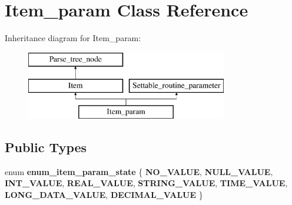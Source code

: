 \hypertarget{classItem__param}{}\section{Item\+\_\+param Class Reference}
\label{classItem__param}
Inheritance diagram for Item\+\_\+param\+:\begin{figure}[H]
\begin{center}
\leavevmode
\includegraphics[height=3.000000cm]{classItem__param}
\end{center}
\end{figure}
\subsection*{Public Types}
\begin{DoxyCompactItemize}
\item 
\mbox{\label{classItem__param_a8b808a2cd552ba160b33df4760a58143}} 
enum {\bfseries enum\+\_\+item\+\_\+param\+\_\+state} \{ \newline
{\bfseries N\+O\+\_\+\+V\+A\+L\+UE}, 
{\bfseries N\+U\+L\+L\+\_\+\+V\+A\+L\+UE}, 
{\bfseries I\+N\+T\+\_\+\+V\+A\+L\+UE}, 
{\bfseries R\+E\+A\+L\+\_\+\+V\+A\+L\+UE}, 
\newline
{\bfseries S\+T\+R\+I\+N\+G\+\_\+\+V\+A\+L\+UE}, 
{\bfseries T\+I\+M\+E\+\_\+\+V\+A\+L\+UE}, 
{\bfseries L\+O\+N\+G\+\_\+\+D\+A\+T\+A\+\_\+\+V\+A\+L\+UE}, 
{\bfseries D\+E\+C\+I\+M\+A\+L\+\_\+\+V\+A\+L\+UE}
 \}
\end{DoxyCompactItemize}
